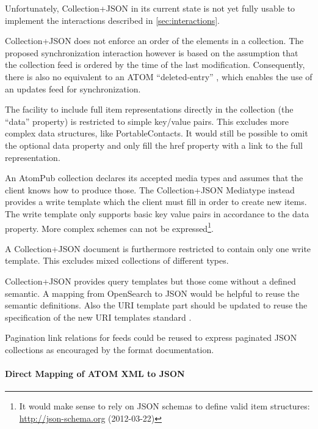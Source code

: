 \documentclass[11pt,a4paper,headsepline,twoside]{scrartcl}		%
\newcommand{\citeurl}[2]{\url{#1} (#2)}
\begin{document}
Unfortunately, Collection+JSON in its current state is not yet fully usable to
implement the interactions described in \ref{sec:interactions}.

Collection+JSON does not enforce an order of the elements in a collection. The
proposed synchronization interaction however is based on the assumption that the
collection feed is ordered by the time of the last modification. Consequently,
there is also no equivalent to an ATOM
``deleted-entry'' \cite{draft-snell-atompub-tombstones-14}, which enables the use
of an updates feed for synchronization.

The facility to include full item representations directly in the collection
(the ``data'' property) is restricted to simple key/value pairs. This excludes
more complex data structures, like PortableContacts. It would still be possible
to omit the optional data property and only fill the href property with a link
to the full representation.

An AtomPub collection declares its accepted media types and assumes that the
client knows how to produce those. The Collection+JSON Mediatype instead
provides a write template which the client must fill in order to create new
items. The write template only supports basic key value pairs in accordance to
the data property. More complex schemes can not be expressed\footnote{It would
  make sense to rely on JSON schemas to define valid item structures:
  \citeurl{http://json-schema.org}{2012-03-22}}.

A Collection+JSON document is furthermore restricted to contain only one write
template. This excludes mixed collections of different types.

Collection+JSON provides query templates but those come without a defined
semantic. A mapping from OpenSearch to JSON would be helpful to reuse the
semantic definitions. Also the URI template part should be updated to reuse the
specification of the new URI templates standard \cite{RFC6570}.

Pagination link relations for feeds \cite{RFC5005} could be reused to express
paginated JSON collections as encouraged by the format
documentation\cite[sec. 5.5]{Amundsen2011a}.


\paragraph{Direct Mapping of ATOM XML to JSON}
\end{document}
